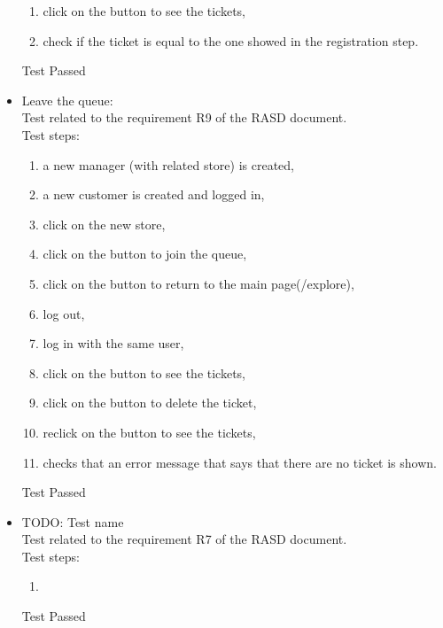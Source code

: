 \begin{itemize}
\begin{enumerate}
        \item click on the button to see the tickets,

        \item check if the ticket is equal to the one showed in the registration step.
    \end{enumerate}
    Test Passed

    \item Leave the queue: \\
    Test related to the requirement R9 of the RASD document. \\
    Test steps:\\
    \begin{enumerate}
        \item a new manager (with related store) is created,

        \item a new customer is created and logged in,

        \item click on the new store,

        \item click on the button to join the queue,

        \item click on the button to return to the main page(/explore),

        \item log out,

        \item log in with the same user,

        \item click on the button to see the tickets,

        \item click on the button to delete the ticket,

        \item reclick on the button to see the tickets,

        \item checks that an error message that says that there are no ticket is shown.
    \end{enumerate}
    Test Passed

    \item TODO: Test name\\
    Test related to the requirement R7 of the RASD document.\\
    Test steps:\\
    \begin{enumerate}
        \item
    \end{enumerate}
    Test Passed
\end{itemize}

